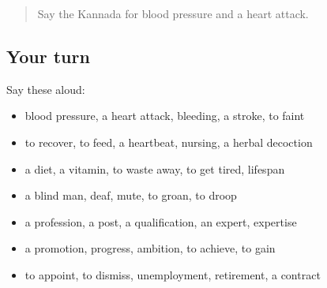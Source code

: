 \label{lesson:KA-R518-review-512-518}



\begin{quote}
Say the Kannada for blood pressure and a heart attack.
\end{quote}

\subsection*{Your turn}
Say these aloud:

\begin{itemize}
\raggedright
  \item blood pressure, a heart attack, bleeding, a stroke, to faint
  \item to recover, to feed, a heartbeat, nursing, a herbal decoction
  \item a diet, a vitamin, to waste away, to get tired, lifespan
  \item a blind man, deaf, mute, to groan, to droop
  \item a profession, a post, a qualification, an expert, expertise
  \item a promotion, progress, ambition, to achieve, to gain
  \item to appoint, to dismiss, unemployment, retirement, a contract
\end{itemize}


